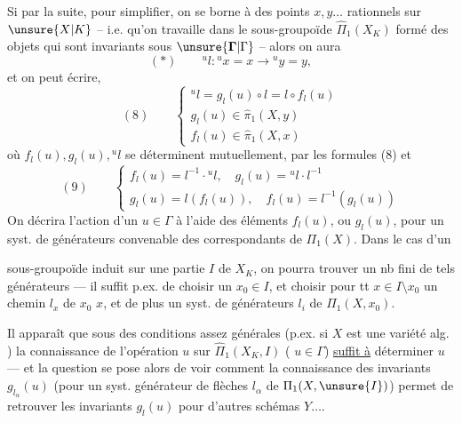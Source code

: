 Si  par la suite, pour simplifier, on se borne à des points $x,y\ldots$ rationnels sur $\unsure{X|K}$ -- i.e. qu'on travaille dans le sous-groupoïde $\widehat\Pi_1(X_K)$ formé des objets qui sont invariants sous $\unsure{\mathbf{\Gamma}|\Gamma}$ -- alors on aura
\[
(*)\qquad{}^u{l}:{}^ux=x\longrightarrow{}^uy=y,
\]
et on peut écrire, 
\[
(8)\qquad\begin{cases}
{}^u{l}=g_{l}(u)\circ{l}={l}\circ f_{l}(u)\\
g_{l}(u)\in\widehat\pi_1(X,y)\\
f_{l}(u)\in\widehat\pi_1(X,x)
\end{cases}
\]
où $f_{l}(u),g_{l}(u),{}^u{l}$ se déterminent mutuellement,  par les formules (8) et
\[
(9)\qquad\begin{cases}
f_{l}(u)={l}^{-1}\cdot{}^u{l},\quad g_{l}(u)={}^u{l}\cdot{l}^{-1}\\
g_{l}(u)={l}(f_{l}(u)),\quad f_{l}(u)={l}^{-1}(g_{l}(u))
\end{cases}
\]
On décrira l'action d'un $u\in\Gamma$  à l'aide des éléments $f_{l}(u)$, ou $g_{l}(u)$, pour un syst. de générateurs convenable des  correspondants de $\Pi_1(X)$. Dans le cas d'un

sous-groupoïde induit sur une partie \uline{}  $I$ de $X_K$, on pourra trouver un nb fini de tels générateurs --- il suffit p.ex. de choisir un  $x_0\in I$, et choisir pour tt $x\in I\setminus x_0$ un chemin $l_x$ de $x_0$  $x$, et de plus un syst.  de générateurs $l_i$ de $\Pi_1(X,x_0)$.

Il apparaît que sous des conditions assez générales (p.ex. si $X$ est une variété alg. ) la connaissance de l'opération $u$ sur $\widehat{\Pi}_1(X_K,I)$ ( $u\in\Gamma$) \uline{suffit à} déterminer $u$ --- et la question se pose alors de voir comment la connaissance des invariants  $g_{l_\alpha}(u)$ (pour un syst. générateur de flèches $l_\alpha$ de $\Pi_1(X,\unsure{I})$) permet de retrouver les invariants $g_l(u)$ pour d'autres schémas $Y\ldots$.


